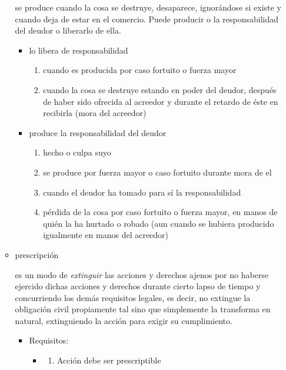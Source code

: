 \documentclass[]{article}
\providecommand{\tightlist}{%
  \setlength{\itemsep}{0pt}\setlength{\parskip}{0pt}}
\begin{document}
\begin{itemize}
\begin{itemize}
    se produce cuando la cosa se destruye, desaparece, ignorándose si
    existe y cuando deja de estar en el comercio. Puede producir o la
    responsabilidad del deudor o liberarlo de ella.

    \begin{itemize}
    \tightlist
    \item
      lo libera de responsabilidad

      \begin{enumerate}
      \def\labelenumi{\arabic{enumi}.}
      \tightlist
      \item
        cuando es producida por caso fortuito o fuerza mayor
      \item
        cuando la cosa se destruye estando en poder del deudor, después
        de haber sido ofrecida al acreedor y durante el retardo de éste
        en recibirla (mora del acreedor)
      \end{enumerate}
    \item
      produce la responsabilidad del deudor

      \begin{enumerate}
      \def\labelenumi{\arabic{enumi}.}
      \tightlist
      \item
        hecho o culpa suyo
      \item
        se produce por fuerza mayor o caso fortuito durante mora de el
      \item
        cuando el deudor ha tomado para sí la responsabilidad
      \item
        pérdida de la cosa por caso fortuito o fuerza mayor, en manos de
        quién la ha hurtado o robado (aun cuando se hubiera producido
        igualmente en manos del acreedor)
      \end{enumerate}
    \end{itemize}
  \item
    prescripción

    es un modo de \emph{extinguir} las acciones y derechos ajenos por no
    haberse ejercido dichas acciones y derechos durante cierto lapso de
    tiempo y concurriendo los demás requisitos legales, es decir, no
    extingue la obligación civil propiamente tal sino que simplemente la
    transforma en natural, extinguiendo la acción para exigir su
    cumplimiento.

    \begin{itemize}
    \tightlist
    \item
      Requisitos:

      \begin{itemize}
      \item
        \begin{enumerate}
        \def\labelenumi{\Alph{enumi})}
        \tightlist
        \item
          Acción debe ser prescriptible


\end{enumerate}
\end{itemize}
\end{itemize}
\end{itemize}
\end{itemize}
\end{document}
